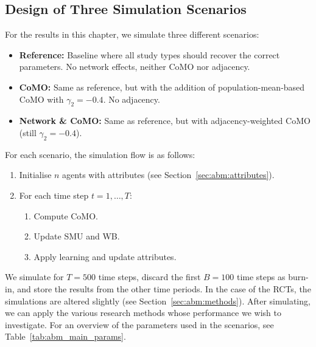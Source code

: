 \subsection{Design of Three Simulation Scenarios}
\label{sec:abm:dynamics}
For the results in this chapter, we simulate three different scenarios:

\begin{itemize}
    \item \textbf{Reference:} Baseline where all study types should recover the correct parameters. No network effects, neither CoMO nor adjacency.
    \item \textbf{CoMO:} Same as reference, but with the addition of population-mean-based CoMO with $\gamma_2 = -0.4$. No adjacency.
    \item \textbf{Network \& CoMO:} Same as reference, but with adjacency-weighted CoMO (still $\gamma_2 = -0.4$).
\end{itemize}

For each scenario, the simulation flow is as follows:

\begin{enumerate}
  \item Initialise $n$ agents with attributes (see Section~\ref{sec:abm:attributes}).
  \item For each time step $t = 1, \ldots, T$:
  \begin{enumerate}
    \item Compute CoMO\@.
    \item Update SMU and WB\@.
    \item Apply learning and update attributes.
  \end{enumerate}
\end{enumerate}

We simulate for $T = 500$ time steps, discard the first $B = 100$ time steps as burn-in, and store the results from the other time periods. In the case of the RCTs, the simulations are altered slightly (see Section~\ref{sec:abm:methods}). After simulating, we can apply the various research methods whose performance we wish to investigate. For an overview of the parameters used in the scenarios, see Table~\ref{tab:abm_main_params}.

